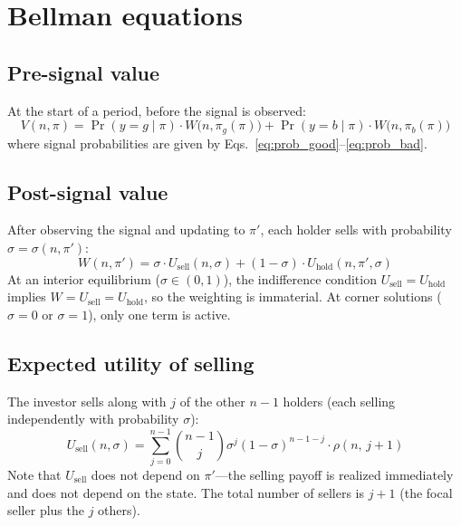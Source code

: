 \documentclass[11pt]{article}
\begin{document}
\section{Bellman equations}

\subsection{Pre-signal value}

At the start of a period, before the signal is observed:
\begin{equation}
    V(n, \pi)
    = \Pr(y{=}g \mid \pi) \cdot W\!\bigl(n, \pi_g(\pi)\bigr)
    + \Pr(y{=}b \mid \pi) \cdot W\!\bigl(n, \pi_b(\pi)\bigr)
    \label{eq:bellman_pre}
\end{equation}
where signal probabilities are given by
Eqs.~\eqref{eq:prob_good}--\eqref{eq:prob_bad}.

\subsection{Post-signal value}

After observing the signal and updating to $\pi'$, each holder sells with
probability $\sigma = \sigma(n, \pi')$:
\begin{equation}
    W(n, \pi')
    = \sigma \cdot U_{\text{sell}}(n, \sigma)
    + (1-\sigma) \cdot U_{\text{hold}}(n, \pi', \sigma)
    \label{eq:bellman_post}
\end{equation}
At an interior equilibrium ($\sigma \in (0,1)$), the indifference condition
$U_{\text{sell}} = U_{\text{hold}}$ implies $W = U_{\text{sell}} =
U_{\text{hold}}$, so the weighting is immaterial. At corner solutions
($\sigma = 0$ or $\sigma = 1$), only one term is active.

\subsection{Expected utility of selling}

The investor sells along with $j$ of the other $n-1$ holders (each selling
independently with probability $\sigma$):
\begin{equation}
    U_{\text{sell}}(n, \sigma)
    = \sum_{j=0}^{n-1} \binom{n-1}{j} \sigma^j (1-\sigma)^{n-1-j}
      \cdot \rho(n,\, j+1)
    \label{eq:u_sell}
\end{equation}
Note that $U_{\text{sell}}$ does not depend on $\pi'$---the selling payoff is
realized immediately and does not depend on the state. The total number of
sellers is $j + 1$ (the focal seller plus the $j$ others).
\end{document}
